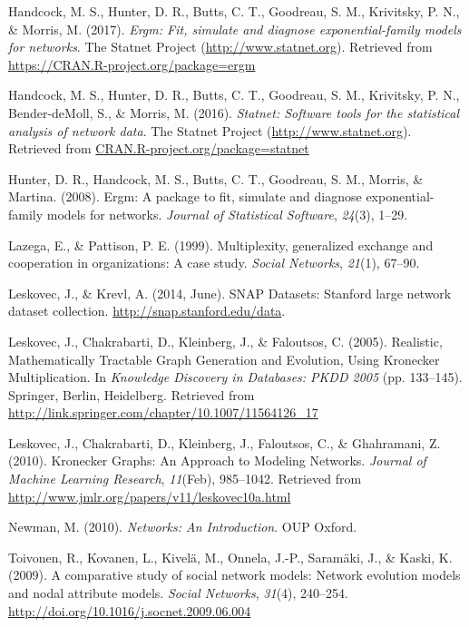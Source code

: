 \documentclass[12pt,twoside]{amherstthesis}
\begin{document}
  \hypertarget{ref-ergmpackagemanual}{}
  Handcock, M. S., Hunter, D. R., Butts, C. T., Goodreau, S. M.,
  Krivitsky, P. N., \& Morris, M. (2017). \emph{Ergm: Fit, simulate and
  diagnose exponential-family models for networks}. The Statnet Project
  (\url{http://www.statnet.org}). Retrieved from
  \url{https://CRAN.R-project.org/package=ergm}
  
  \hypertarget{ref-statnetpackagemanual}{}
  Handcock, M. S., Hunter, D. R., Butts, C. T., Goodreau, S. M.,
  Krivitsky, P. N., Bender-deMoll, S., \& Morris, M. (2016).
  \emph{Statnet: Software tools for the statistical analysis of network
  data}. The Statnet Project (\url{http://www.statnet.org}). Retrieved
  from \url{CRAN.R-project.org/package=statnet}
  
  \hypertarget{ref-ergmpackagearticle}{}
  Hunter, D. R., Handcock, M. S., Butts, C. T., Goodreau, S. M., Morris,
  \& Martina. (2008). Ergm: A package to fit, simulate and diagnose
  exponential-family models for networks. \emph{Journal of Statistical
  Software}, \emph{24}(3), 1--29.
  
  \hypertarget{ref-lazega1999multiplexity}{}
  Lazega, E., \& Pattison, P. E. (1999). Multiplexity, generalized
  exchange and cooperation in organizations: A case study. \emph{Social
  Networks}, \emph{21}(1), 67--90.
  
  \hypertarget{ref-snapnets}{}
  Leskovec, J., \& Krevl, A. (2014, June). SNAP Datasets: Stanford large
  network dataset collection. \url{http://snap.stanford.edu/data}.
  
  \hypertarget{ref-leskovec_realistic_2005}{}
  Leskovec, J., Chakrabarti, D., Kleinberg, J., \& Faloutsos, C. (2005).
  Realistic, Mathematically Tractable Graph Generation and Evolution,
  Using Kronecker Multiplication. In \emph{Knowledge Discovery in
  Databases: PKDD 2005} (pp. 133--145). Springer, Berlin, Heidelberg.
  Retrieved from
  \url{http://link.springer.com/chapter/10.1007/11564126_17}
  
  \hypertarget{ref-leskovec_kronecker_2010}{}
  Leskovec, J., Chakrabarti, D., Kleinberg, J., Faloutsos, C., \&
  Ghahramani, Z. (2010). Kronecker Graphs: An Approach to Modeling
  Networks. \emph{Journal of Machine Learning Research}, \emph{11}(Feb),
  985--1042. Retrieved from
  \url{http://www.jmlr.org/papers/v11/leskovec10a.html}
  
  \hypertarget{ref-newman_networks:_2010}{}
  Newman, M. (2010). \emph{Networks: An Introduction}. OUP Oxford.
  
  \hypertarget{ref-toivonen_comparative_2009}{}
  Toivonen, R., Kovanen, L., Kivelä, M., Onnela, J.-P., Saramäki, J., \&
  Kaski, K. (2009). A comparative study of social network models: Network
  evolution models and nodal attribute models. \emph{Social Networks},
  \emph{31}(4), 240--254.
  \url{http://doi.org/10.1016/j.socnet.2009.06.004}
  
\end{document}
